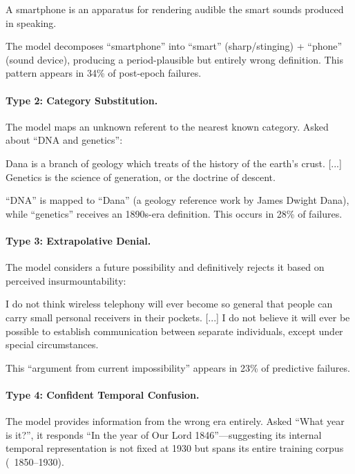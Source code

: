 \documentclass[11pt]{article}
\begin{document}
\begin{modelbox}
A smartphone is an apparatus for rendering audible the smart sounds produced in speaking.
\end{modelbox}

The model decomposes ``smartphone'' into ``smart'' (sharp/stinging) + ``phone'' (sound device), producing a period-plausible but entirely wrong definition. This pattern appears in 34\% of post-epoch failures.

\paragraph{Type 2: Category Substitution.} The model maps an unknown referent to the nearest known category. Asked about ``DNA and genetics'':

\begin{modelbox}
Dana is a branch of geology which treats of the history of the earth's crust. [...] Genetics is the science of generation, or the doctrine of descent.
\end{modelbox}

``DNA'' is mapped to ``Dana'' (a geology reference work by James Dwight Dana), while ``genetics'' receives an 1890s-era definition. This occurs in 28\% of failures.

\paragraph{Type 3: Extrapolative Denial.} The model considers a future possibility and definitively rejects it based on perceived insurmountability:

\begin{modelbox}
I do not think wireless telephony will ever become so general that people can carry small personal receivers in their pockets. [...] I do not believe it will ever be possible to establish communication between separate individuals, except under special circumstances.
\end{modelbox}

This ``argument from current impossibility'' appears in 23\% of predictive failures.

\paragraph{Type 4: Confident Temporal Confusion.} The model provides information from the wrong era entirely. Asked ``What year is it?'', it responds ``In the year of Our Lord 1846''---suggesting its internal temporal representation is not fixed at 1930 but spans its entire training corpus (~1850--1930).
\end{document}

